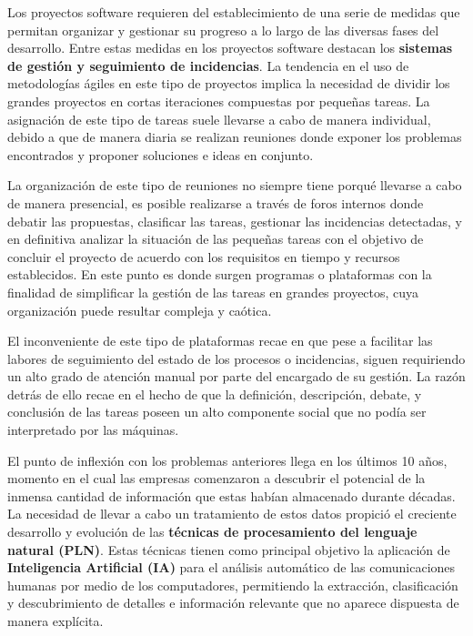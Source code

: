 
Los proyectos software requieren del establecimiento de una serie de medidas que permitan organizar y gestionar su progreso a lo largo de las diversas fases del desarrollo. Entre estas medidas en los proyectos software destacan los \textbf{sistemas de gestión y seguimiento de incidencias}. La tendencia en el uso de metodologías ágiles en este tipo de proyectos implica la necesidad de dividir los grandes proyectos en cortas iteraciones compuestas por pequeñas tareas. La asignación de este tipo de tareas suele llevarse a cabo de manera individual, debido a que de manera diaria se realizan reuniones donde exponer los problemas encontrados y proponer soluciones e ideas en conjunto.

La organización de este tipo de reuniones no siempre tiene porqué llevarse a cabo de manera presencial, es posible realizarse a través de foros internos donde debatir las propuestas, clasificar las tareas, gestionar las incidencias detectadas, y en definitiva analizar la situación de las pequeñas tareas con el objetivo de concluir el proyecto de acuerdo con los requisitos en tiempo y recursos establecidos. En este punto es donde surgen programas o plataformas con la finalidad de simplificar la gestión de las tareas en grandes proyectos, cuya organización puede resultar compleja y caótica.

El inconveniente de este tipo de plataformas recae en que pese a facilitar las labores de seguimiento del estado de los procesos o incidencias, siguen requiriendo un alto grado de atención manual por parte del encargado de su gestión. La razón detrás de ello recae en el hecho de que la definición, descripción, debate, y conclusión de las tareas poseen un alto componente social que no podía ser interpretado por las máquinas.

El punto de inflexión con los problemas anteriores llega en los últimos 10 años, momento en el cual las empresas comenzaron a descubrir el potencial de la inmensa cantidad de información que estas habían almacenado durante décadas. La necesidad de llevar a cabo un tratamiento de estos datos propició el creciente desarrollo y evolución de las \textbf{técnicas de procesamiento del lenguaje natural (PLN)}. Estas técnicas tienen como principal objetivo la aplicación de \textbf{Inteligencia Artificial (IA)} para el análisis automático de las comunicaciones humanas por medio de los computadores, permitiendo la extracción, clasificación y descubrimiento de detalles e información relevante que no aparece dispuesta de manera explícita.

